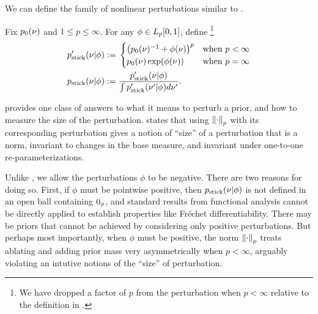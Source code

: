 We can define the family of nonlinear perturbations similar to
\citep{gustafson:1996:local}.

\begin{defn}
%
Fix $p_{0}(\nu)$ and $1 \le p \le \infty$.  For any $\phi \in {L_{p}[0,1]}$, define
\footnote{We have dropped a factor of $p$ from the perturbation when $p <
\infty$ relative to the definition in \citep{gustafson:1996:local}.}
%
\begin{align*}
%
\pstick'(\nu \vert \phi) :={}& \begin{cases}
%
\left(\pbase(\nu)^{-1} + \phi(\nu) \right)^{p}
    & \textrm{when }p < \infty \\
\pbase(\nu)\exp(\phi(\nu))
    & \textrm{when }p = \infty
%
\end{cases}\\
%
\pstick(\nu \vert \phi) :={}&
    \frac{\pstick'(\nu \vert \phi)}{\int \pstick'(\nu' \vert \phi) d\nu'}.
%
\end{align*}
%
\end{defn}
%

 provides one class of answers to what it means to perturb
a prior, and how to measure the size of the perturbation.  \citep[Result
2]{gustafson:1996:local} states that using $\left\Vert\cdot\right\Vert_p$ with its
corresponding perturbation gives a notion of ``size'' of a perturbation that is
a norm, invariant to changes in the base measure, and invariant under one-to-one
re-parameterizations.

Unlike \citep{gustafson:1996:local}, we allow the perturbations $\phi$ to be
negative.  There are two reasons for doing so.  First, if $\phi$ must be
pointwise positive, then $p_{\mathrm{stick}}(\nu \vert \phi)$ is not defined in an open
ball containing $0_\phi$, and standard results from functional analysis cannot be
directly applied to establish properties like Fr{\'e}chet differentiability.
There may be priors that cannot be achieved by considering only positive
perturbations.  But perhaps most importantly, when $\phi$ must be positive, the
norm $\left\Vert\cdot\right\Vert_p$ treats ablating and adding prior mass very asymmetrically
when $p < \infty$, arguably violating an intutive notions of the ``size''
of perturbation.

